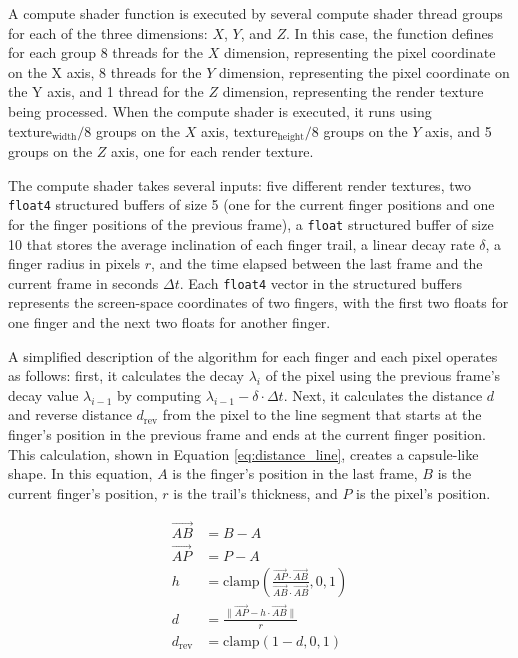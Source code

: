         A compute shader function is executed by several compute shader thread groups for each of the three dimensions: \(X\), \(Y\), and \(Z\). In this case, the function defines for each group 8 threads for the \(X\) dimension, representing the pixel coordinate on the X axis, 8 threads for the \(Y\) dimension, representing the pixel coordinate on the Y axis, and 1 thread for the \(Z\) dimension, representing the render texture being processed. When the compute shader is executed, it runs using \(\text{texture}_{\text{width}} / 8\) groups on the \(X\) axis, \(\text{texture}_{\text{height}} / 8\) groups on the \(Y\) axis, and 5 groups on the \(Z\) axis, one for each render texture.

        The compute shader takes several inputs: five different render textures, two \lstinline{float4} structured buffers of size 5 (one for the current finger positions and one for the finger positions of the previous frame), a \lstinline{float} structured buffer of size 10 that stores the average inclination of each finger trail, a linear decay rate $\delta$, a finger radius in pixels $r$, and the time elapsed between the last frame and the current frame in seconds $\Delta t$. Each \lstinline{float4} vector in the structured buffers represents the screen-space coordinates of two fingers, with the first two floats for one finger and the next two floats for another finger.

        A simplified description of the algorithm for each finger and each pixel operates as follows: first, it calculates the decay \(\lambda_i\) of the pixel using the previous frame's decay value \(\lambda_{i-1}\) by computing \(\lambda_{i-1} - \delta \cdot \Delta t\). Next, it calculates the distance \(d\) and reverse distance $d_{\mathrm{rev}}$ from the pixel to the line segment that starts at the finger's position in the previous frame and ends at the current finger position. This calculation, shown in Equation \ref{eq:distance_line}, creates a capsule-like shape. In this equation, \(A\) is the finger's position in the last frame, \(B\) is the current finger's position, \(r\) is the trail's thickness, and \(P\) is the pixel's position.

        \begin{figure}[h]
        \begin{equation}
        \begin{split} \label{eq:distance_line}
            \vec{AB} &= B - A \\
            \vec{AP} &= P - A \\
            h &= \mathrm{clamp} \left( \frac{\vec{AP} \cdot \vec{AB}}{\vec{AB} \cdot \vec{AB}} , 0, 1\right)  \\
            d &= \frac{\| \vec{AP} - h \cdot \vec{AB} \|}{r} \\
            d_{\mathrm{rev}} &= \mathrm{clamp} \left( 1 - d , 0 , 1\right)
        \end{split}
        \end{equation}
        \end{figure}


